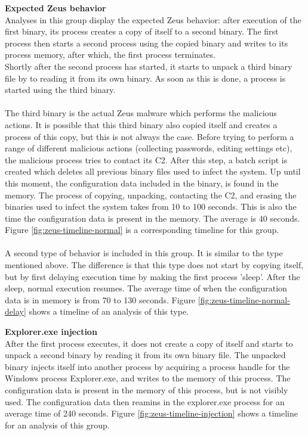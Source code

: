 \documentclass[conference]{IEEEtran}
\begin{document}
\newpage
\textbf{Expected Zeus behavior}
\\Analyses in this group display the expected Zeus behavior: \cite{wyke-zeus} after execution of the first binary, its process creates a copy of itself to a second binary. The first process then starts a second process using the copied binary and writes to its process memory, after which, the first process terminates.\\ Shortly after the second process has started, it starts to unpack a third binary file by to reading it from its own binary. As soon as this is done, a process is started using the third binary.
\\\\The third binary is the actual Zeus malware which performs the \Gls{malicious actions}. It is possible that this third binary also copied itself and creates a process of this copy, but this is not always the case. Before trying to perform a range of different malicious actions (collecting passwords, editing settings etc), the malicious process tries to contact its C2. After this step, a batch script is created which deletes all previous binary files used to infect the system. Up until this moment, the configuration data included in the binary, is found in the memory. The process of copying, unpacking, contacting the C2, and erasing the binaries used to infect the system takes from 10 to 100 seconds. This is also the time the configuration data is present in the memory. The average is 40 seconds.  Figure \ref{fig:zeus-timeline-normal} is a corresponding timeline for this group. \\\\A second type of behavior is included in this group. It is similar to the type mentioned above. The difference is that this type does not start by copying itself, but by first delaying execution time by making the first process 'sleep'. After the sleep, normal execution resumes. The average time of when the configuration data is in memory is from 70 to 130 seconds. Figure \ref{fig:zeus-timeline-normal-delay} shows a timeline of an analysis of this type.


\newpage

\textbf{Explorer.exe injection}
\\After the first process executes, it does not create a copy of itself and starts to unpack a second binary by reading it from its own binary file. The unpacked binary injects itself into another process by acquiring a process handle for the Windows process Explorer.exe, and writes to the memory of this process. The configuration data is present in the memory of this process, but is not visibly used. The configuration data then reamins in the explorer.exe process for an average time of 240 seconds. Figure \ref{fig:zeus-timeline-injection} shows a timeline for an analysis of this group.\\
\end{document}
